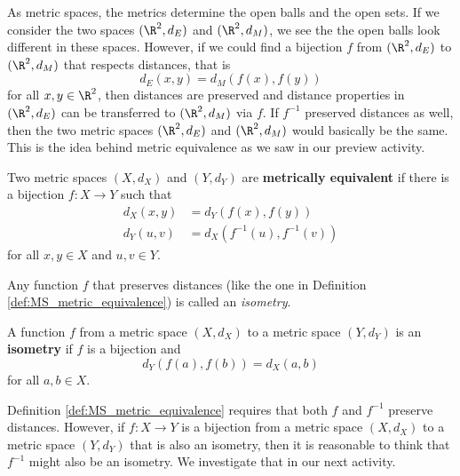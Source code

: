 \begin{comment}
	\ea


\item  We created an example in problem 3 with $X = ((0,1), d_E)$ and $Y = ((0,2), d_E)$, where $f : X \to Y$ defined by $f(x) = 2x$ provides the equivalence.  

\ee

\end{comment}


As metric spaces, the metrics determine the open balls and the open sets. If we consider the two spaces $(\R^2, d_E)$ and $(\R^2, d_M)$, we see the the open balls look different in these spaces. However, if we could find a bijection $f$ from $(\R^2, d_E)$ to $(\R^2, d_M)$ that respects distances, that is 
\[d_E(x,y) = d_M(f(x), f(y))\]
for all $x, y \in \R^2$, then distances are preserved and distance properties in $(\R^2, d_E)$ can be transferred to $(\R^2, d_M)$ via $f$. If $f^{-1}$ preserved distances as well, then the two metric spaces $(\R^2, d_E)$ and $(\R^2, d_M)$ would basically be the same. This is the idea behind metric equivalence as we saw in our preview activity.

\begin{definition} \label{def:MS_metric_equivalence} Two metric spaces $(X,d_X)$ and $(Y,d_Y)$ are \textbf{metrically equivalent} if there is a bijection $f : X \to Y$ such that 
\begin{align*}
d_X(x,y) &= d_Y(f(x),f(y)) \\
d_Y(u,v) &= d_X(f^{-1}(u), f^{-1}(v))
\end{align*}
for all $x,y \in X$ and $u,v \in Y$. 
\end{definition}

Any function $f$ that preserves distances (like the one in Definition \ref{def:MS_metric_equivalence}) is called an \emph{isometry}. 

\begin{definition} A function $f$ from a metric space $(X,d_X)$ to a metric space $(Y, d_Y)$ is an \textbf{isometry} if $f$ is a bijection and 
\begin{equation} \label{eq:distance_preserving} 
d_Y(f(a),f(b)) = d_X(a,b)
\end{equation}
for all $a, b \in X$. 
\end{definition}

Definition \ref{def:MS_metric_equivalence} requires that both $f$ and $f^{-1}$ preserve distances. However, if $f : X \to Y$  is a bijection from a metric space $(X,d_X)$ to a metric space $(Y,d_Y)$ that is also an isometry, then it is reasonable to think that $f^{-1}$ might also be an isometry. We investigate that in our next activity.

